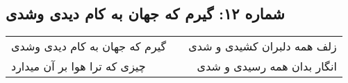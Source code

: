 \begin{center}
\section*{شماره ۱۲: گیرم که جهان به کام دیدی وشدی}
\label{sec:012}
\begin{longtable}{l p{0.5cm} r}
گیرم که جهان به کام دیدی وشدی
&&
زلف همه دلبران کشیدی و شدی
\\
چیزی که ترا هوا بر آن میدارد
&&
انگار بدان همه رسیدی و شدی
\\
\end{longtable}
\end{center}
